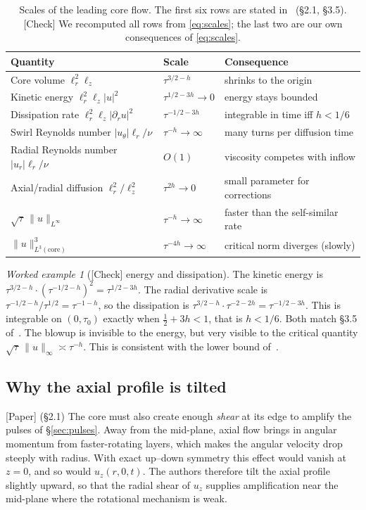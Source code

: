 \documentclass[11pt]{article}
\theoremstyle{plain}
\theoremstyle{remark}
\newtheorem*{example}{Worked example}
\newcommand{\paper}{\textsf{\small[Paper]}}
\newcommand{\chk}{\textsf{\small[Check]}}
\begin{document}
\begin{table}[h]
\centering\small
\begin{tabular}{@{}lll@{}}
\toprule
Quantity & Scale & Consequence \\
\midrule
Core volume $\ell_r^2\ell_z$ & $\tau^{3/2-h}$ & shrinks to the origin\\
Kinetic energy $\ell_r^2\ell_z|u|^2$ & $\tau^{1/2-3h}\to0$ & energy stays bounded\\
Dissipation rate $\ell_r^2\ell_z|\partial_r u|^2$ & $\tau^{-1/2-3h}$ & integrable in time iff $h<1/6$\\
Swirl Reynolds number $|u_\theta|\ell_r/\nu$ & $\tau^{-h}\to\infty$ & many turns per diffusion time\\
Radial Reynolds number $|u_r|\ell_r/\nu$ & $O(1)$ & viscosity competes with inflow\\
Axial/radial diffusion $\ell_r^2/\ell_z^2$ & $\tau^{2h}\to0$ & small parameter for corrections\\
$\sqrt{\tau}\,\|u\|_{L^\infty}$ & $\tau^{-h}\to\infty$ & faster than the self-similar rate\\
$\|u\|_{L^3(\text{core})}^3$ & $\tau^{-4h}\to\infty$ & critical norm diverges (slowly)\\
\bottomrule
\end{tabular}
\caption{Scales of the leading core flow. The first six rows are stated in~\cite{OAI} (\S2.1, \S3.5). \chk{} We recomputed all rows from \eqref{eq:scales}; the last two are our own consequences of \eqref{eq:scales}.}
\label{tab:scales}
\end{table}

\begin{example}[\chk{} energy and dissipation]
The kinetic energy is $\tau^{3/2-h}\cdot(\tau^{-1/2-h})^2=\tau^{1/2-3h}$. The radial derivative scale is $\tau^{-1/2-h}/\tau^{1/2}=\tau^{-1-h}$, so the dissipation is $\tau^{3/2-h}\cdot\tau^{-2-2h}=\tau^{-1/2-3h}$. This is integrable on $(0,\tau_0)$ exactly when $\tfrac12+3h<1$, that is $h<1/6$. Both match \S3.5 of~\cite{OAI}. The blowup is invisible to the energy, but very visible to the critical quantity $\sqrt\tau\,\|u\|_\infty\asymp\tau^{-h}$. This is consistent with the lower bound of~\cite{Leray}.
\end{example}

\subsection{Why the axial profile is tilted}
\paper{} (\S2.1) The core must also create enough \emph{shear} at its edge to amplify the pulses of \S\ref{sec:pulses}. Away from the mid-plane, axial flow brings in angular momentum from faster-rotating layers, which makes the angular velocity drop steeply with radius. With exact up--down symmetry this effect would vanish at $z=0$, and so would $u_z(r,0,t)$. The authors therefore tilt the axial profile slightly upward, so that the radial shear of $u_z$ supplies amplification near the mid-plane where the rotational mechanism is weak.
\end{document}
